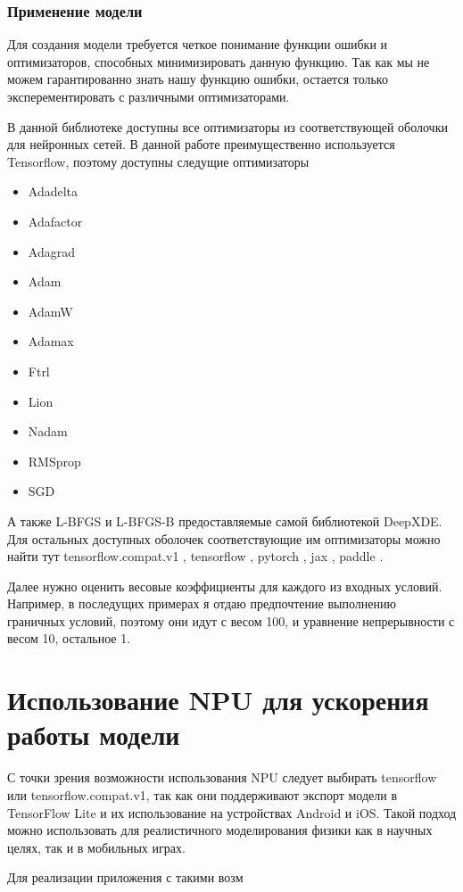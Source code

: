 \subsection{Применение модели}
Для создания модели требуется четкое понимание функции ошибки и оптимизаторов, способных минимизировать данную функцию.
Так как мы не можем гарантированно знать нашу функцию ошибки, остается только эксперементировать с различными
оптимизаторами.

В данной библиотеке доступны все оптимизаторы из соответствующей оболочки для нейронных сетей. В данной работе преимущественно
используется Tensorflow, поэтому доступны следущие оптимизаторы

\begin{itemize}
    \item Adadelta
    \item Adafactor
    \item Adagrad
    \item Adam
    \item AdamW
    \item Adamax
    \item Ftrl
    \item Lion
    \item Nadam
    \item RMSprop
    \item SGD
\end{itemize}
А также L-BFGS и L-BFGS-B предоставляемые самой библиотекой DeepXDE.
Для остальных доступных оболочек соответствующие им оптимизаторы можно найти тут tensorflow.compat.v1 \cite{tfv1opt},
tensorflow \cite{tfopt}, pytorch \cite{pytorchopt}, jax \cite{jaxopt}, paddle \cite{paddleopt}.

Далее нужно оценить весовые коэффициенты для каждого из входных условий. Например, в последущих примерах я отдаю предпочтение
выполнению граничных условий, поэтому они идут с весом 100, и уравнение непрерывности с весом 10, остальное 1.



\chapter{Использование NPU для ускорения работы модели}

С точки зрения возможности использования NPU следует выбирать tensorflow или tensorflow.compat.v1,
так как они поддерживают экспорт модели в TensorFlow Lite и их использование на устройствах Android
и iOS\cite{nnapi}. Такой подход можно использовать для реалистичного моделирования физики как в научных целях, так и
в мобильных играх.

Для реализации приложения с такими возм